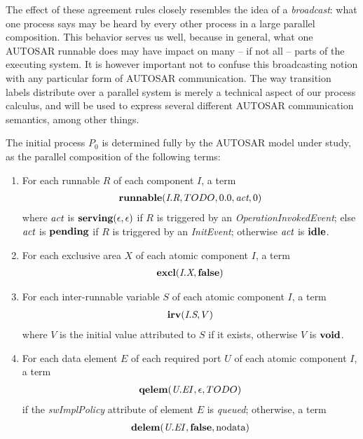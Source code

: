 \documentclass[twocolumn]{article}
\begin{document}
The effect of these agreement rules closely resembles the idea of a \emph{broadcast}: what one process says may be heard by every other process in a large parallel composition. This behavior serves us well, because in general, what one AUTOSAR runnable does may have impact on many -- if not all -- parts of the executing system. It is however important not to confuse this broadcasting notion with any particular form of AUTOSAR communication. The way transition labels distribute over a parallel system is merely a technical aspect of our process calculus, and will be used to express several different AUTOSAR communication semantics, among other things.

The initial process $P_0$ is determined fully by the AUTOSAR model under study, as the parallel composition of the following terms:
\begin{enumerate}

\item For each runnable $R$ of each component $I$, a term
$$
\begin{array}{c}
	\runnable{\Tr{R}{I}}{TODO}{0.0}{\Act}{0}
\end{array}
$$
where $\Act$ is $\serving{\epsilon}{\epsilon}$ if $R$ is triggered by an \emph{OperationInvokedEvent}; else $\Act$ is $\pending$ if $R$ is triggered by an \emph{InitEvent}; otherwise $\Act$ is $\idle$.

\item For each exclusive area $X$ of each atomic component $I$, a term
$$
\begin{array}{c}
	\excl{\Tx{X}{I}}{\false}
\end{array}
$$

\item For each inter-runnable variable $S$ of each atomic component $I$, a term
$$
\begin{array}{c}
	\irv{\Ts{S}{I}}{V}
\end{array}
$$
where $V$ is the initial value attributed to $S$ if it exists, otherwise $V$ is $\void$.

\item For each data element $E$ of each required port $U$ of each atomic component $I$, a term
$$
\begin{array}{c}
	\qelem{\Te{E}{U}{I}}{\epsilon}{TODO}
\end{array}
$$
if the \emph{swImplPolicy} attribute of element $E$ is \emph{queued}; otherwise, a term
$$
\begin{array}{c}
	\delem{\Te{E}{U}{I}}{\false}{\text{nodata}}
\end{array}
$$


\end{enumerate}
\end{document}
